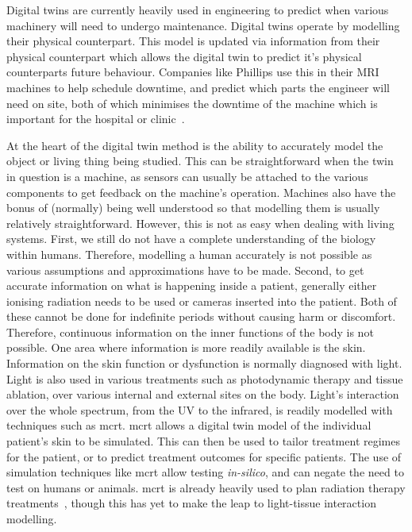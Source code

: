 \noindent Digital twins are currently heavily used in engineering to predict when various machinery will need to undergo maintenance.
Digital twins operate by modelling their physical counterpart.
This model is updated via information from their physical counterpart which allows the digital twin to predict it's physical counterparts future behaviour.
Companies like Phillips use this in their MRI machines to help schedule downtime, and predict which parts the engineer will need on site, both of which minimises the downtime of the machine which is important for the hospital or clinic~\cite{henkvanhouten2018}.

At the heart of the digital twin method is the ability to accurately model the object or living thing being studied.
This can be straightforward when the twin in question is a machine, as sensors can usually be attached to the various components to get feedback on the machine's operation.
Machines also have the bonus of (normally) being well understood so that modelling them is usually relatively straightforward.
However, this is not as easy when dealing with living systems.
First, we still do not have a complete understanding of the biology within humans.
Therefore, modelling a human accurately is not possible as various assumptions and approximations have to be made.
Second, to get accurate information on what is happening inside a patient, generally either ionising radiation needs to be used or cameras inserted into the patient.
Both of these cannot be done for indefinite periods without causing harm or discomfort.
Therefore, continuous information on the inner functions of the body is not possible.
One area where information is more readily available is the skin.
Information on the skin function or dysfunction is normally diagnosed with light.
Light is also used in various treatments such as photodynamic therapy and tissue ablation, over various internal and external sites on the body.
Light's interaction over the whole spectrum, from the UV to the infrared, is readily modelled with techniques such as \gls*{mcrt}.
\Gls*{mcrt} allows a digital twin model of the individual patient's skin to be simulated.
This can then be used to tailor treatment regimes for the patient, or to predict treatment outcomes for specific patients.
The use of simulation techniques like \gls*{mcrt} allow testing \textit{in-silico}, and can negate the need to test on humans or animals.
\Gls*{mcrt} is already heavily used to plan radiation therapy treatments~\cite{andreo2018monte,andreo1991monte}, though this has yet to make the leap to light-tissue interaction modelling.


